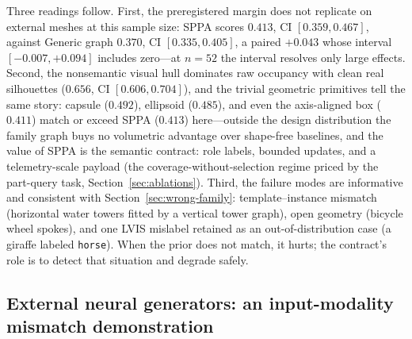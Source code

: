\documentclass[11pt,a4paper]{article}
\begin{document}
Three readings follow. First, the preregistered margin does not replicate on
external meshes at this sample size: SPPA scores \(0.413\),
CI \([0.359,0.467]\), against Generic graph \(0.370\), CI \([0.335,0.405]\), a
paired \(+0.043\) whose interval \([-0.007,+0.094]\) includes zero---at
\(n{=}52\) the interval resolves only large effects. Second,
the nonsemantic visual hull dominates raw occupancy with clean real
silhouettes (\(0.656\), CI \([0.606,0.704]\)), and the trivial geometric
primitives tell the same story: capsule (\(0.492\)), ellipsoid (\(0.485\)),
and even the axis-aligned box (\(0.411\)) match or exceed SPPA
(\(0.413\)) here---outside the design distribution the family graph buys no
volumetric advantage over shape-free baselines, and the value of SPPA is the
semantic contract: role labels, bounded updates, and a telemetry-scale
payload (the coverage-without-selection regime priced by the part-query
task, Section~\ref{sec:ablations}).
Third, the failure modes are informative and consistent with
Section~\ref{sec:wrong-family}: template--instance mismatch (horizontal water
towers fitted by a vertical tower graph), open geometry (bicycle wheel
spokes), and one LVIS mislabel retained as an out-of-distribution case (a
giraffe labeled \texttt{horse}). When the prior does not match, it hurts; the
contract's role is to detect that situation and degrade safely.

\subsection{External neural generators: an input-modality mismatch demonstration}
\label{sec:neural-external-wave}
\end{document}
